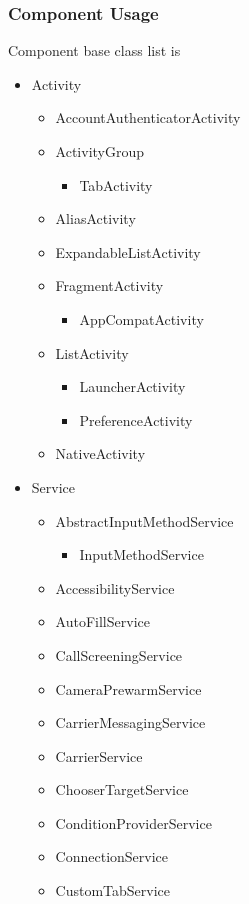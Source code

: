 \documentclass{article}
\begin{document}
\subsubsection{Component Usage}
Component base class list is
\begin{itemize}
	\item Activity
		\begin{itemize}
			\item AccountAuthenticatorActivity
			\item ActivityGroup
				\begin{itemize}
					\item TabActivity
				\end{itemize}
			\item AliasActivity
			\item ExpandableListActivity
			\item FragmentActivity 
				\begin{itemize}
					\item AppCompatActivity
				\end{itemize}
			\item ListActivity
				\begin{itemize}
					\item LauncherActivity
					\item PreferenceActivity
				\end{itemize}
			\item NativeActivity
		\end{itemize}
	\item Service
		\begin{itemize}
			\item AbstractInputMethodService
				\begin{itemize}
					\item InputMethodService
				\end{itemize}
			\item AccessibilityService
			\item AutoFillService
			\item CallScreeningService
			\item CameraPrewarmService
			\item CarrierMessagingService
			\item CarrierService
			\item ChooserTargetService
			\item ConditionProviderService
			\item ConnectionService
			\item CustomTabService

\end{itemize}
\end{itemize}
\end{document}
